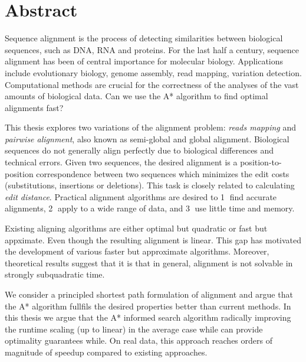 \begingroup
\let\clearpage\relax
\let\cleardoublepage\relax
\let\cleardoublepage\relax

\chapter*{Abstract}

Sequence alignment is the process of detecting similarities between biological
sequences, such as DNA, RNA and proteins. For the last half a century, sequence
alignment has been of central importance for molecular biology. Applications
include evolutionary biology, genome assembly, read mapping, variation
detection. Computational methods are crucial for the correctness of the analyses
of the vast amounts of biological data. Can we use the A* algorithm to find
optimal alignments fast?

This thesis explores two variations of the alignment problem: \emph{reads
mapping} and \emph{pairwise alignment}, also known as semi-global and global
alignment. Biological sequences do not generally align perfectly due to
biological differences and technical errors. Given two sequences, the desired
alignment is a position-to-position correspondence between two sequences which
minimizes the edit costs (substitutions, insertions or deletions). This task is
closely related to calculating \emph{edit distance}. Practical alignment
algorithms are desired to \textcircled{1} find accurate alignments,
\textcircled{2} apply to a wide range of data, and \textcircled{3} use little
time and memory.

Existing aligning algorithms are either optimal but quadratic or fast but
appximate. Even though the resulting alignment is linear. This gap has motivated
the development of various faster but approximate algorithms. Moreover,
theoretical results suggest that it is that in general, alignment is not
solvable in strongly subquadratic time.

We consider a principled shortest path formulation of alignment and argue that
the A* algorithm fullfils the desired properties better than current methods. In
this thesis we argue that the A* informed search algorithm radically improving
the runtime scaling (up to linear) in the average case while can provide
optimality guarantees while. On real data, this approach reaches orders of
magnitude of speedup compared to existing approaches.

